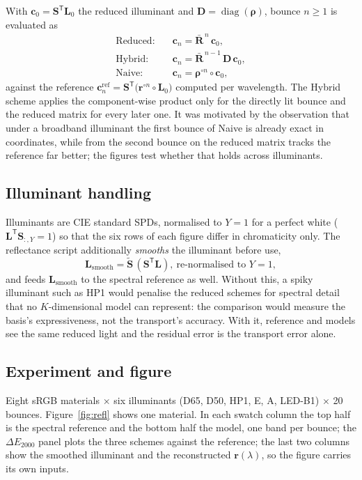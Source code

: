 \documentclass[11pt,a4paper]{article}
\newcommand{\mS}{\mathbf{S}}
\newcommand{\mSd}{\tilde{\mathbf{S}}}
\newcommand{\mRb}{\bar{\mathbf{R}}}
\newcommand{\vr}{\mathbf{r}}
\newcommand{\vrho}{\boldsymbol{\rho}}
\newcommand{\vc}{\mathbf{c}}
\newcommand{\vL}{\mathbf{L}}
\newcommand{\diag}{\operatorname{diag}}
\newcommand{\dE}{\Delta E_{2000}}
\newcommand{\transp}{^{\mathsf{T}}}
\begin{document}
With $\vc_0 = \mS\transp\vL_0$ the reduced illuminant and $\mathbf{D} =
\diag(\vrho)$, bounce $n\ge1$ is evaluated as
\begin{align}
  \text{Reduced:}  &\quad \vc_n = \mRb^{\,n}\,\vc_0, \\
  \text{Hybrid:}   &\quad \vc_n = \mRb^{\,n-1}\,\mathbf{D}\,\vc_0, \\
  \text{Naive:}    &\quad \vc_n = \vrho^{\circ n}\circ\vc_0 ,
\end{align}
against the reference $\vc_n^{\text{ref}} = \mS\transp\!\big(\vr^{\circ n}\circ
\vL_0\big)$ computed per wavelength.  The Hybrid scheme applies the
component-wise product only for the directly lit bounce and the reduced matrix
for every later one.  It was motivated by the observation that under a
broadband illuminant the first bounce of Naive is already exact in coordinates,
while from the second bounce on the reduced matrix tracks the reference far
better; the figures test whether that holds across illuminants.

\subsection{Illuminant handling}

Illuminants are CIE standard SPDs, normalised to $Y=1$ for a perfect white
($\vL\transp\mS_{:,Y}=1$) so that the six rows of each figure differ in
chromaticity only.  The reflectance script additionally \emph{smooths} the
illuminant before use,
\begin{equation}
  \vL_{\text{smooth}} = \mSd\,(\mS\transp\vL),\ \text{re-normalised to } Y=1,
\end{equation}
and feeds $\vL_{\text{smooth}}$ to the spectral reference as well.  Without
this, a spiky illuminant such as HP1 would penalise the reduced schemes for
spectral detail that no $K$-dimensional model can represent: the comparison
would measure the basis's expressiveness, not the transport's accuracy.  With
it, reference and models see the same reduced light and the residual error is
the transport error alone.

\subsection{Experiment and figure}

Eight sRGB materials $\times$ six illuminants (D65, D50, HP1, E, A, LED-B1)
$\times$ 20 bounces.  Figure~\ref{fig:refl} shows one material.  In each swatch
column the top half is the spectral reference and the bottom half the model,
one band per bounce; the $\dE$ panel plots the three schemes against the
reference; the last two columns show the smoothed illuminant and the
reconstructed $\vr(\lambda)$, so the figure carries its own inputs.
\end{document}
